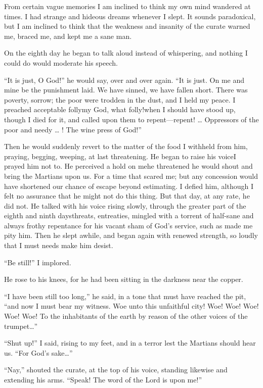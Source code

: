 From certain vague memories I am inclined to think my own mind
wandered at times. I had strange and hideous dreams whenever I
slept. It sounds paradoxical, but I am inclined to think that the
weakness and insanity of the curate warned me, braced me, and kept
me a sane man.

On the eighth day he began to talk aloud instead of whispering, and
nothing I could do would moderate his speech.

``It is just, O God!'' he would say, over and over again. ``It is
just. On me and mine be the punishment laid. We have sinned, we
have fallen short. There was poverty, sorrow; the poor were trodden
in the dust, and I held my peace. I preached acceptable folly\dash{}my
God, what folly!\dash{}when I should have stood up, though I died for
it, and called upon them to repent—repent! \ldots{} Oppressors of the
poor and needy \ldots{} ! The wine press of God!''

Then he would suddenly revert to the matter of the food I withheld
from him, praying, begging, weeping, at last threatening. He began
to raise his voice\dash{}I prayed him not to. He perceived a hold on
me\dash{}he threatened he would shout and bring the Martians upon us.
For a time that scared me; but any concession would have shortened
our chance of escape beyond estimating. I defied him, although I
felt no assurance that he might not do this thing. But that day, at
any rate, he did not. He talked with his voice rising slowly,
through the greater part of the eighth and ninth days\dash{}threats,
entreaties, mingled with a torrent of half-sane and always frothy
repentance for his vacant sham of God's service, such as made me
pity him. Then he slept awhile, and began again with renewed
strength, so loudly that I must needs make him desist.

``Be still!'' I implored.

He rose to his knees, for he had been sitting in the darkness near
the copper.

``I have been still too long,'' he said, in a tone that must have
reached the pit, ``and now I must bear my witness. Woe unto this
unfaithful city! Woe! Woe! Woe! Woe! Woe! To the inhabitants of the
earth by reason of the other voices of the trumpet\ldots{}''

``Shut up!'' I said, rising to my feet, and in a terror lest the
Martians should hear us. ``For God's sake\ldots{}''

``Nay,'' shouted the curate, at the top of his voice, standing
likewise and extending his arms. ``Speak! The word of the Lord is
upon me!''

